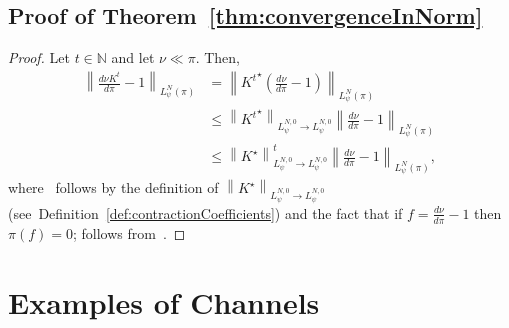 \documentclass[11pt]{article}
\theoremstyle{plain}
\theoremstyle{remark}
\begin{document}
    \subsection{Proof of Theorem~\ref{thm:convergenceInNorm}}\label{app:convergenceInNorm}
\begin{proof}
        Let $t\in\mathbb{N}$ and let $\nu\ll\pi$. Then,
         \begin{align}
            \left\lVert \frac{d\nu K^t}{d\pi} -1 \right\rVert_{L_\psi^{N}(\pi)}
            &= \left\lVert {K^t}^\star \left(\frac{d\nu}{d\pi} -1 \right) \right\rVert_{L_\psi^{N}(\pi)} \\
            &\leq \left\lVert {K^t}^\star\right\rVert_{L_\psi^{N,0}\to L_\psi^{N,0} } \left\lVert \frac{d\nu}{d\pi}-1\right\rVert_{L_\psi^{N}(\pi)} \label{eq:boundOnNormPsiMixing} \\
            &\leq \left\lVert {K}^\star\right\rVert_{L_\psi^{N,0}\to L_\psi^{N,0} }^t \left\lVert \frac{d\nu}{d\pi}-1\right\rVert_{L_\psi^{N}(\pi)}\label{eq:boundOnNormTensorPsi}, 
        \end{align}
    where~ follows by the definition of $\left\lVert {K}^\star\right\rVert_{L_\psi^{N,0}\to L_\psi^{N,0} }$ (see~Definition~\ref{def:contractionCoefficients}) and the fact that if $f=\frac{d\nu}{d\pi}-1$ then $\pi\left(f\right)=0$;  follows from~.
\end{proof} \iffalse 
\section{Examples of Channels }\label{app:channelExamples}
\end{document}
